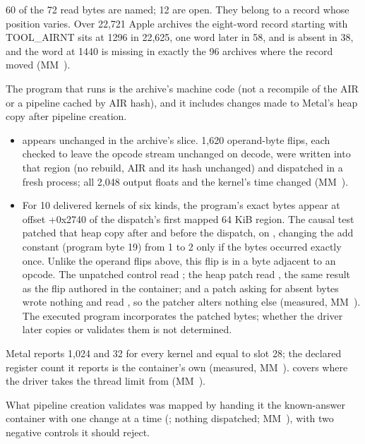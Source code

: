 60 of the 72 read bytes are named; 12 are open. They belong to a record whose position varies. Over
22,721 Apple archives the eight-word record starting with TOOL\_AIRNT sits at 1296 in 22,625, one word later in 58, and is
absent in 38, and the word at 1440 is missing in exactly the 96 archives where the record moved (MM~).

The program that runs is the archive's machine code (not a recompile of the AIR or a pipeline cached by AIR hash), and
it includes changes made to Metal's heap copy after pipeline creation.

\begin{itemize}
\item {} appears unchanged in the archive's  slice. 1,620 operand-byte flips, each checked to
  leave the opcode stream unchanged on decode, were written into that region (no rebuild, AIR and its hash unchanged) and
  dispatched in a fresh process; all 2,048 output floats and the kernel's time changed (MM~).
\item For 10 delivered kernels of six kinds, the program's exact bytes appear at offset +0x2740 of the dispatch's first
  mapped 64 KiB region. The causal test patched that heap copy after  and before the dispatch,
  on , changing the add constant (program byte 19) from 1 to 2 only if the bytes occurred exactly once.
  Unlike the operand flips above, this flip is in a byte adjacent to an opcode.
  The unpatched control read ; the heap patch read , the same result as the flip authored in the
  container; and a patch asking for absent bytes wrote nothing and read , so the patcher alters nothing else
  (measured, MM~). The executed program incorporates the patched bytes; whether the driver
  later copies or validates them is not determined.
\end{itemize}

Metal reports  1,024 and  32 for every kernel and
 equal to slot 28; the declared register count it reports is the container's own
(measured, MM~).  covers where the driver takes the thread limit from (MM~).

What pipeline creation validates was mapped by handing it the known-answer container with one change at a time
(; nothing dispatched; MM~), with two negative controls it should reject.

